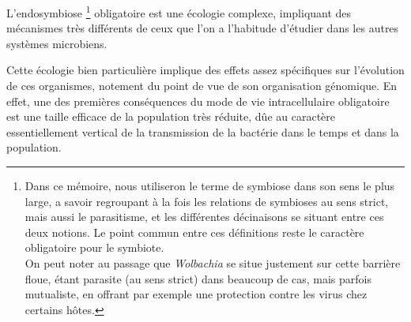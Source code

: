 


L’endosymbiose%
\footnote{Dans ce mémoire, nous utiliseron le terme de symbiose dans son sens le plus large, a savoir regroupant à la fois les relations de symbioses au sens strict, mais aussi le parasitisme, et les différentes décinaisons se situant entre ces deux notions. Le point commun entre ces définitions reste le caractère obligatoire pour le symbiote.\\
On peut noter au passage que \textit{Wolbachia} se situe justement sur cette barrière floue, étant parasite (au sens strict) dans beaucoup de cas, mais parfois mutualiste, en offrant par exemple une protection contre les virus chez certains hôtes.}
obligatoire est une écologie complexe, impliquant des mécanismes très différents de ceux que l’on a l’habitude d’étudier dans les autres systèmes microbiens.

Cette écologie bien particulière implique des effets assez spécifiques sur l'évolution de ces organismes, notement du point de vue de son organisation génomique.
En effet, une des premières conséquences du mode de vie intracellulaire obligatoire est une taille efficace de la population très réduite, dûe au caractère essentiellement vertical de la transmission de la bactérie dans le temps et dans la population.


